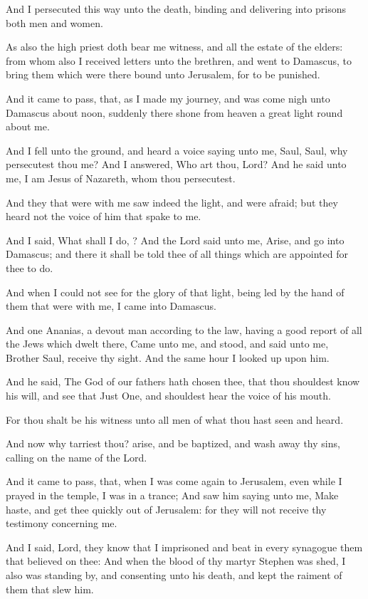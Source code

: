 \verse And I persecuted this way unto the death, binding and delivering into prisons both men and women.

\verse As also the high priest doth bear me witness, and all the estate of the elders: from whom also I received letters unto the brethren, and went to Damascus, to bring them which were there bound unto Jerusalem, for to be punished.

\verse And it came to pass, that, as I made my journey, and was come nigh unto Damascus about noon, suddenly there shone from heaven a great light round about me.

\verse And I fell unto the ground, and heard a voice saying unto me, Saul, Saul, why persecutest thou me?  \verse And I answered, Who art thou, Lord? And he said unto me, I am Jesus of Nazareth, whom thou persecutest.

\verse And they that were with me saw indeed the light, and were afraid; but they heard not the voice of him that spake to me.

\verse And I said, What shall I do, \LORD? And the Lord said unto me, Arise, and go into Damascus; and there it shall be told thee of all things which are appointed for thee to do.

\verse And when I could not see for the glory of that light, being led by the hand of them that were with me, I came into Damascus.

\verse And one Ananias, a devout man according to the law, having a good report of all the Jews which dwelt there, \verse Came unto me, and stood, and said unto me, Brother Saul, receive thy sight. And the same hour I looked up upon him.

\verse And he said, The God of our fathers hath chosen thee, that thou shouldest know his will, and see that Just One, and shouldest hear the voice of his mouth.

\verse For thou shalt be his witness unto all men of what thou hast seen and heard.

\verse And now why tarriest thou? arise, and be baptized, and wash away thy sins, calling on the name of the Lord.

\verse And it came to pass, that, when I was come again to Jerusalem, even while I prayed in the temple, I was in a trance; \verse And saw him saying unto me, Make haste, and get thee quickly out of Jerusalem: for they will not receive thy testimony concerning me.

\verse And I said, Lord, they know that I imprisoned and beat in every synagogue them that believed on thee: \verse And when the blood of thy martyr Stephen was shed, I also was standing by, and consenting unto his death, and kept the raiment of them that slew him.

